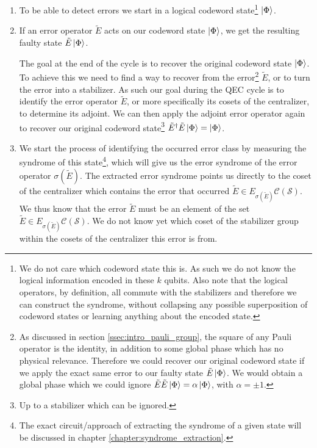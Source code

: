 \begin{enumerate}

\item To be able to detect errors we start in a logical codeword state\footnote{
We do not care which codeword state this is. As such we do not know the logical information encoded in these $k$ qubits.
Also note that the logical operators, by definition, all commute with the stabilizers and therefore we can construct the syndrome, 
without collapsing any possible superposition of codeword states or learning anything about the encoded state. 
} $\ket{\Phi}$.

\item If an error operator $\tilde{E}$ acts on our codeword state $\ket{\Phi}$,
we get the resulting faulty state $\tilde{E}\ket{\Phi}$.

The goal at the end of the cycle is to recover the original codeword state $\ket{\Phi}$.
To achieve this we need to find a way to recover from the error\footnote{
As discussed in section \ref{ssec:intro_pauli_group}, the square of any Pauli operator is the identity, in addition to some global phase which has no physical relevance.
Therefore we could recover our original codeword state if we apply the exact same error to our faulty state $\tilde{E}\ket{\Phi}$.
We would obtain a global phase which we could ignore $\tilde{E}\tilde{E}\ket{\Phi} = \alpha \ket{\Phi}$, with $\alpha=\pm 1$.
} $\tilde{E}$, or to turn the error into a stabilizer.
As such our goal during the QEC cycle is to identify the error operator $\tilde{E}$, or more specifically its cosets of the centralizer, to determine its adjoint.
We can then apply the adjoint error operator again to recover our original codeword state\footnote{Up to a stabilizer which can be ignored.} $\tilde{E}^\dag\tilde{E}\ket{\Phi} = \ket{\Phi}$.

\item We start the process of identifying the occurred error class by measuring the syndrome of this state\footnote{
The exact circuit/approach of extracting the syndrome of a given state will be discussed in chapter \ref{chapter:syndrome_extraction}.
}, which will give us the error syndrome of the error operator $\sigma(\tilde{E})$. 
The extracted error syndrome points us directly to the coset of the centralizer which contains the error that occurred $\tilde{E} \in E_{\sigma(\tilde{E})}\mathcal{C}(\mathcal{S})$.
We thus know that the error $\tilde{E}$ must be an element of the set $\tilde{E}\in E_{\sigma(\tilde{E})}\mathcal{C}(\mathcal{S})$.
We do not know yet which coset of the stabilizer group within the cosets of the centralizer this error is from.


\end{enumerate}
